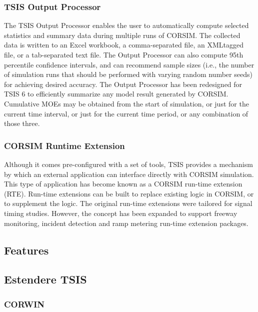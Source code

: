 \subsubsection{TSIS Output Processor}

The TSIS Output Processor enables the user to automatically compute selected statistics and summary data during
multiple runs of CORSIM. The collected data is written to an Excel workbook, a comma-separated file, an XMLtagged
file, or a tab-separated text file. The Output Processor can also compute 95th percentile confidence intervals,
and can recommend sample sizes (i.e., the number of simulation runs that should be performed with varying random
number seeds) for achieving desired accuracy. The Output Processor has been redesigned for TSIS 6 to efficiently
summarize any model result generated by CORSIM. Cumulative MOEs may be obtained from the start of
simulation, or just for the current time interval, or just for the current time period, or any combination of those three.

\subsubsection{CORSIM Runtime Extension}

Although it comes pre-configured with a set of tools, TSIS provides a mechanism by which an external application
can interface directly with CORSIM simulation. This type of application has become known as a CORSIM run-time
extension (RTE). Run-time extensions can be built to replace existing logic in CORSIM, or to supplement the
logic. The original run-time extensions were tailored for signal timing studies. However, the concept has been
expanded to support freeway monitoring, incident detection and ramp metering run-time extension packages.

\subsection{Features}

\subsection{Estendere TSIS}

\subsubsection{CORWIN}

